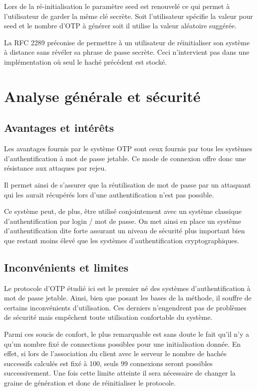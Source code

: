 \documentclass{../res/univ-projet}
\begin{document}
    Lors de la ré-initialisation le paramètre seed est renouvelé ce qui permet à
    l'utilisateur de garder la même clé secrète. Soit l'utilisateur spécifie la valeur
    pour seed et le nombre d'OTP à générer soit il utilise la valeur aléatoire suggérée.
    
    La RFC 2289 préconise de permettre à un utilisateur de réinitialiser son système
    à distance sans révéler sa phrase de passe secrète. Ceci n'intervient pas dans
    une implémentation où seul le haché précédent est stocké.

\section{Analyse générale et sécurité}
    \subsection{Avantages et intérêts}
    Les avantages fournis par le système OTP sont ceux fournis par tous les
    systèmes d'authentification à mot de passe jetable. Ce mode de connexion 
    offre donc une résistance aux attaques par rejeu.
    
    Il permet ainsi de s'assurer que la réutilisation de mot de passe par un
    attaquant qui les aurait récupérés lors d'une authentification n'est pas 
    possible.
    
    Ce système peut, de plus, être utilisé conjointement avec un système 
    classique d'authentification par login / mot de passe. On met ainsi en 
    place un système d'authentification dite forte assurant un niveau de 
    sécurité plus important bien que restant moins élevé que les systèmes
    d'authentification cryptographiques.
  
  \subsection{Inconvénients et limites}
  Le protocole d'OTP étudié ici est le premier né des systèmes 
  d'authentification à mot de passe jetable. Ainsi, bien que posant les bases
  de la méthode, il souffre de certains inconvénients d'utilisation. Ces 
  derniers n'engendrent pas de problèmes de sécurité mais empêchent toute 
  utilisation confortable du système.
  
  Parmi ces soucis de confort, le plus remarquable est sans doute le fait
  qu'il n'y a qu'un nombre fixé de connections possibles pour une 
  initialisation donnée. En effet, si lors de l'association du client avec 
  le serveur le nombre de hachés successifs calculés est fixé à 100, seuls 
  99 connexions seront possibles successivement. Une fois cette limite 
  atteinte il sera nécessaire de changer la graine de génération et donc
  de réinitialiser le protocole.
  
\end{document}
